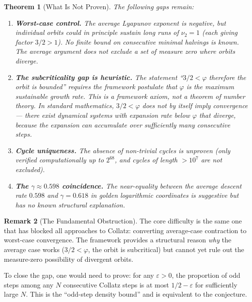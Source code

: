 \documentclass[11pt,a4paper]{article}
\newtheorem{theorem}{Theorem}[section]
\theoremstyle{definition}
\newtheorem{remark}[theorem]{Remark}
\newcommand{\gam}{\gamma}
\begin{document}
\begin{theorem}[What Is Not Proven]\label{thm:not-proven}
The following gaps remain:
\begin{enumerate}[nosep,label=(\roman*)]
  \item \textbf{Worst-case control.} The average Lyapunov exponent is
    negative, but individual orbits could in principle sustain long runs of
    $\nu_2 = 1$ (each giving factor $3/2 > 1$). No finite bound on
    consecutive minimal halvings is known. The average argument does not
    exclude a set of measure zero where orbits diverge.

  \item \textbf{The subcriticality gap is heuristic.} The statement ``$3/2 <
    \varphi$ therefore the orbit is bounded'' requires the framework
    postulate that $\varphi$ is the maximum sustainable growth rate. This is
    a framework axiom, not a theorem of number theory. In standard
    mathematics, $3/2 < \varphi$ does not by itself imply convergence ---
    there exist dynamical systems with expansion rate below $\varphi$ that
    diverge, because the expansion can accumulate over sufficiently many
    consecutive steps.

  \item \textbf{Cycle uniqueness.} The absence of non-trivial cycles is
    unproven (only verified computationally up to $2^{68}$, and cycles of
    length $> 10^7$ are not excluded).

  \item \textbf{The $\gam \approx 0.598$ coincidence.} The near-equality
    between the average descent rate $0.598$ and $\gam = 0.618$ in golden
    logarithmic coordinates is suggestive but has no known structural
    explanation.
\end{enumerate}
\end{theorem}

\begin{remark}[The Fundamental Obstruction]
The core difficulty is the same one that has blocked all approaches to Collatz:
converting average-case contraction to worst-case convergence. The framework
provides a structural reason \emph{why} the average case works ($3/2 <
\varphi$, the orbit is subcritical) but cannot yet rule out the measure-zero
possibility of divergent orbits.

To close the gap, one would need to prove: for any $\varepsilon > 0$, the
proportion of odd steps among any $N$ consecutive Collatz steps is at most
$1/2 - \varepsilon$ for sufficiently large $N$. This is the ``odd-step density
bound'' and is equivalent to the conjecture.
\end{remark}
\end{document}
